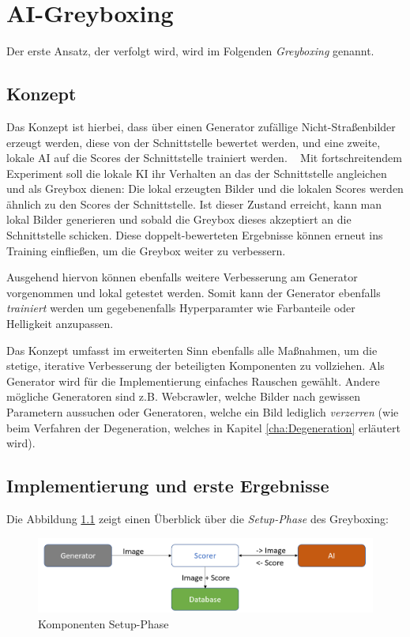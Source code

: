 \chapter{AI-Greyboxing}
\label{cha:GreyBoxing}
Der erste Ansatz, der verfolgt wird, wird im Folgenden \textit{Greyboxing} genannt.
\section{Konzept}
\label{sec:KonzeptGreyBoxing}
Das Konzept ist hierbei, dass über einen Generator zufällige Nicht-Straßenbilder erzeugt werden, diese von der Schnittstelle bewertet werden, und eine zweite, lokale AI auf die Scores der Schnittstelle trainiert werden. 
~\newline
Mit fortschreitendem Experiment soll die lokale \ac{KI} ihr Verhalten an das der Schnittstelle angleichen und als Greybox dienen: 
Die lokal erzeugten Bilder und die lokalen Scores werden ähnlich zu den Scores der Schnittstelle. 
Ist dieser Zustand erreicht, kann man lokal Bilder generieren und sobald die Greybox dieses akzeptiert an die Schnittstelle schicken. 
Diese doppelt-bewerteten Ergebnisse können erneut ins Training einfließen, um die Greybox weiter zu verbessern. 

Ausgehend hiervon können ebenfalls weitere Verbesserung am Generator vorgenommen und lokal getestet werden.
Somit kann der Generator ebenfalls \textit{trainiert} werden um gegebenenfalls Hyperparamter wie Farbanteile oder Helligkeit anzupassen. 

Das Konzept umfasst im erweiterten Sinn ebenfalls alle Maßnahmen, um die stetige, iterative Verbesserung der beteiligten Komponenten zu vollziehen. 
Als Generator wird für die Implementierung einfaches Rauschen gewählt. 
Andere mögliche Generatoren sind z.B. Webcrawler, welche Bilder nach gewissen Parametern aussuchen oder Generatoren, welche ein Bild lediglich \textit{verzerren} (wie beim Verfahren der Degeneration, welches in Kapitel \ref{cha:Degeneration} erläutert wird).

\section{Implementierung und erste Ergebnisse}\label{sec:ImplementierungGreyBoxing}

Die Abbildung \ref{fig:greyboxingstart} zeigt einen Überblick über die \textit{Setup-Phase} des Greyboxing:

\begin{figure}[h]
	\centering
	\includegraphics[width=0.9\linewidth]{Images/GreyBoxingStart}
	\caption[Komponenten Setup-Phase]{Komponenten Setup-Phase}
	\label{fig:greyboxingstart}
\end{figure}

